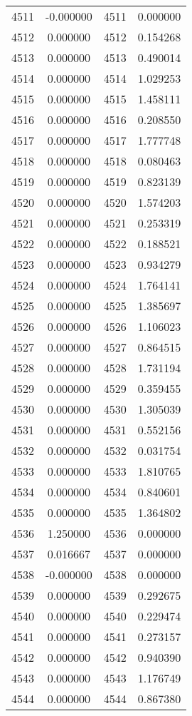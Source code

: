 \documentclass[12pt]{article}
\begin{document}
\begin{longtable}{@{}cccc@{}}
4511 & -0.000000 & 4511 & 0.000000 \\
4512 & 0.000000 & 4512 & 0.154268 \\
4513 & 0.000000 & 4513 & 0.490014 \\
4514 & 0.000000 & 4514 & 1.029253 \\
4515 & 0.000000 & 4515 & 1.458111 \\
4516 & 0.000000 & 4516 & 0.208550 \\
4517 & 0.000000 & 4517 & 1.777748 \\
4518 & 0.000000 & 4518 & 0.080463 \\
4519 & 0.000000 & 4519 & 0.823139 \\
4520 & 0.000000 & 4520 & 1.574203 \\
4521 & 0.000000 & 4521 & 0.253319 \\
4522 & 0.000000 & 4522 & 0.188521 \\
4523 & 0.000000 & 4523 & 0.934279 \\
4524 & 0.000000 & 4524 & 1.764141 \\
4525 & 0.000000 & 4525 & 1.385697 \\
4526 & 0.000000 & 4526 & 1.106023 \\
4527 & 0.000000 & 4527 & 0.864515 \\
4528 & 0.000000 & 4528 & 1.731194 \\
4529 & 0.000000 & 4529 & 0.359455 \\
4530 & 0.000000 & 4530 & 1.305039 \\
4531 & 0.000000 & 4531 & 0.552156 \\
4532 & 0.000000 & 4532 & 0.031754 \\
4533 & 0.000000 & 4533 & 1.810765 \\
4534 & 0.000000 & 4534 & 0.840601 \\
4535 & 0.000000 & 4535 & 1.364802 \\
4536 & 1.250000 & 4536 & 0.000000 \\
4537 & 0.016667 & 4537 & 0.000000 \\
4538 & -0.000000 & 4538 & 0.000000 \\
4539 & 0.000000 & 4539 & 0.292675 \\
4540 & 0.000000 & 4540 & 0.229474 \\
4541 & 0.000000 & 4541 & 0.273157 \\
4542 & 0.000000 & 4542 & 0.940390 \\
4543 & 0.000000 & 4543 & 1.176749 \\
4544 & 0.000000 & 4544 & 0.867380 \\

\end{longtable}
\end{document}
